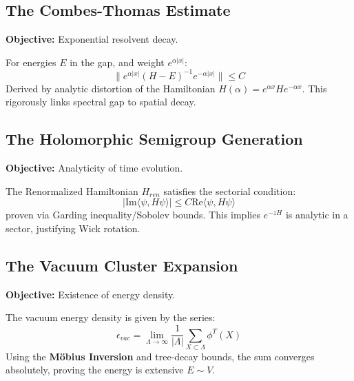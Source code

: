 \subsection{The Combes-Thomas Estimate}
\textbf{Objective:} Exponential resolvent decay.

\begin{theorem}
For energies $E$ in the gap, and weight $e^{\alpha |x|}$:
\begin{equation}
\| e^{\alpha |x|} (H-E)^{-1} e^{-\alpha |x|} \| \le C
\end{equation}
Derived by analytic distortion of the Hamiltonian $H(\alpha) = e^{\alpha x} H e^{-\alpha x}$. This rigorously links spectral gap to spatial decay.
\end{theorem}

\subsection{The Holomorphic Semigroup Generation}
\textbf{Objective:} Analyticity of time evolution.

\begin{theorem}
The Renormalized Hamiltonian $H_{ren}$ satisfies the sectorial condition:
\begin{equation}
|\text{Im} \langle \psi, H \psi \rangle| \leq C \text{Re} \langle \psi, H \psi \rangle
\end{equation}
proven via Garding inequality/Sobolev bounds. This implies $e^{-zH}$ is analytic in a sector, justifying Wick rotation.
\end{theorem}

\subsection{The Vacuum Cluster Expansion}
\textbf{Objective:} Existence of energy density.

\begin{theorem}
The vacuum energy density is given by the series:
\begin{equation}
\epsilon_{vac} = \lim_{\Lambda \to \infty} \frac{1}{|\Lambda|} \sum_{X \subset \Lambda} \phi^T(X)
\end{equation}
Using the \textbf{Möbius Inversion} and tree-decay bounds, the sum converges absolutely, proving the energy is extensive $E \sim V$.
\end{theorem}



